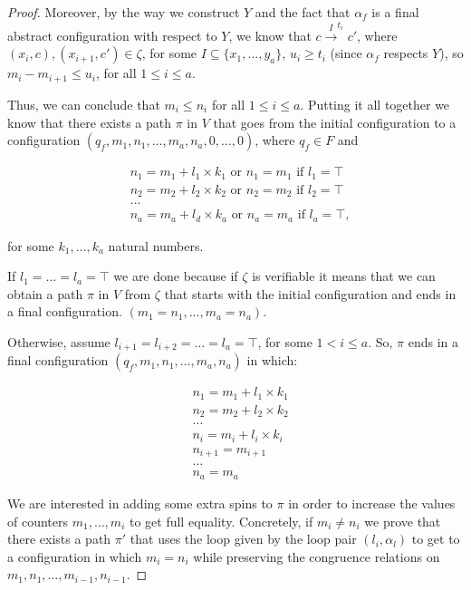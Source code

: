 \begin{proof}
Moreover, by the way we construct $Y$ and the fact that $\alpha_f$ is a final abstract configuration with respect to $Y$, we know that $c\xrightarrow{I}^{t_i}c'$, where $(x_i,c),(x_{i+1},c')\in \zeta$, for some $I\subseteq\{x_1,\dots,y_a\}$, $u_i\geq t_i$ (since $\alpha_f$ respects $Y$), so $m_{i}-m_{i+1}\leq u_i$, for all $1\leq i\leq a$.


Thus, we can conclude that $m_i\leq n_i$ for all $1\leq i\leq a$. Putting it all together we know that there exists a path $\pi$ in $V$ that goes from the initial configuration to a configuration $(q_f,m_1,n_1,\dots,m_a,n_a,0,\dots,0)$, where $q_f\in F$ and 

\begin{align*}
    &n_1 = m_1 + l_1\times k_1\text{ or } n_1 = m_1\text{ if } l_1=\top\\
    &n_2 = m_2 + l_2\times k_2\text{ or } n_2 = m_2\text{ if } l_2=\top\\
    &\dots\\
    &n_a = m_a + l_d\times k_a\text{ or } n_a = m_a\text{ if } l_a=\top,
\end{align*}

for some $k_1,\dots,k_a$ natural numbers.

If $l_1=\dots=l_a=\top$ we are done because if $\zeta$ is verifiable it means that we can obtain a path $\pi$ in $V$ from $\zeta$ that starts with the initial configuration and ends in a final configuration. $(m_1=n_1,\dots,m_a=n_a)$. 

Otherwise, assume $l_{i+1}=l_{i+2}=\dots=l_a=\top$, for some $1<i\leq a$. So, $\pi$ ends in a final configuration $(q_f,m_1,n_1,\dots,m_a,n_a)$ in which:

\begin{align*}
    &n_1 = m_1 + l_1\times k_1\\
    &n_2 = m_2 + l_2\times k_2\\
    &\dots\\
    &n_i = m_i + l_i\times k_i\\
    &n_{i+1} = m_{i+1}\\
    &\dots\\
    &n_a = m_a   
\end{align*}

We are interested in adding some extra spins to $\pi$ in order to increase the values of counters $m_1,\dots,m_i$ to get full equality. Concretely, if $m_{i}\neq n_{i}$ we prove that there exists a path $\pi'$ that uses the loop given by the loop pair $(l_{i},\alpha_l)$ to get to a configuration in which $m_{i}=n_{i}$ while preserving the congruence relations on $m_1,n_1,\dots,m_{i-1},n_{i-1}$. 


\end{proof}
